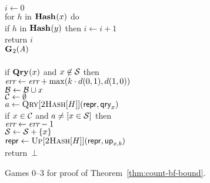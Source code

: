 \begin{figure}
{      $i \gets 0$\\
      for $h$ in $\mathbf{Hash}\hspace{0.5pt}(x)$ do\\
      \tab if $h$ in $\mathbf{Hash}\hspace{0.5pt}(y)$ then $i \gets i+1$\\
      return $i$
    \\[6pt]
    \underline{$\mathbf{G}\hspace{0.5pt}_2(\mathit{A})$}\\[2pt]
    \\
      if $\mathbf{Qry}\hspace{0.5pt}(x)$ and $x \not\in \mathcal{S}$ then\\
      \tab $\textit{err} \gets \textit{err} + \max(k \cdot d(0,1), d(1,0))$\\
      $\mathcal{B} \gets \mathcal{B} \cup x$\\
      $\mathcal{C} \gets \emptyset$\\
      $a \gets \textsc{Qry}[\textsc{2Hash}[H]](\mathsf{repr}, \mathsf{qry}_x)$\\
      if $x \in \mathcal{C}$ and $a \neq [x \in \mathcal{S}]$ then\\
      \tab $\textit{err} \gets \textit{err}-1$\\
      $\mathcal{S} \gets \mathcal{S} + \{x\}$\\
      $\mathsf{repr} \gets \textsc{Up}[\textsc{2Hash}[H]](\mathsf{repr},\mathsf{up}_{x,b})$\\
      return~$\bot$
  }
  {
  }
  {
  }
  \caption{Games 0--3 for proof of Theorem~\ref{thm:count-bf-bound}.}
  \label{fig:count-bf-bound}
\end{figure}


